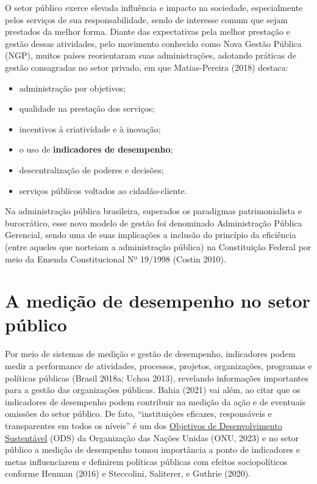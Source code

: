 \documentclass[
  letterpaper,
  DIV=11,
  numbers=noendperiod]{scrreprt}
\begin{document}

O setor público exerce elevada influência e impacto na sociedade,
especialmente pelos serviços de sua responsabilidade, sendo de interesse
comum que sejam prestados da melhor forma. Diante das expectativas pela
melhor prestação e gestão dessas atividades, pelo movimento conhecido
como Nova Gestão Pública (NGP), muitos países reorientaram suas
administrações, adotando práticas de gestão consagradas no setor
privado, em que Matias-Pereira (2018) destaca:

\begin{itemize}
\item
  administração por objetivos;
\item
  qualidade na prestação dos serviços;
\item
  incentivos à criatividade e à inovação;
\item
  o uso de \textbf{indicadores de desempenho};
\item
  descentralização de poderes e decisões;
\item
  serviços públicos voltados ao cidadão-cliente.
\end{itemize}

Na administração pública brasileira, superados os paradigmas
patrimonialista e burocrático, esse novo modelo de gestão foi denominado
Administração Pública Gerencial, sendo uma de suas implicações a
inclusão do princípio da eficiência (entre aqueles que norteiam a
administração pública) na Constituição Federal por meio da Emenda
Constitucional Nº 19/1998 (Costin 2010).

\hypertarget{a-mediuxe7uxe3o-de-desempenho-no-setor-puxfablico}{%
\section*{A medição de desempenho no setor
público}\label{a-mediuxe7uxe3o-de-desempenho-no-setor-puxfablico}}


Por meio de sistemas de medição e gestão de desempenho, indicadores
podem medir a performance de atividades, processos, projetos,
organizações, programas e políticas públicas (Brasil 2018a; Uchoa 2013),
revelando informações importantes para a gestão das organizações
públicas. Bahia (2021) vai além, ao citar que os indicadores de
desempenho podem contribuir na medição da ação e de eventuais omissões
do setor público. De fato, ``instituições eficazes, responsáveis e
transparentes em todos os níveis'' é um dos
\href{https://brasil.un.org/pt-br/sdgs}{Objetivos de Desenvolvimento
Sustentável} (ODS) da Organização das Nações Unidas (ONU, 2023) e no
setor público a medição de desempenho tomou importância a ponto de
indicadores e metas influenciarem e definirem políticas públicas com
efeitos sociopolíticos conforme Henman (2016) e Steccolini, Saliterer, e
Guthrie (2020).
\end{document}
